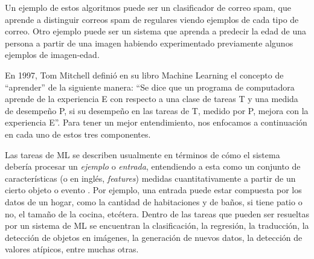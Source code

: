 \documentclass[../../main.tex]{subfiles}
\begin{document}
Un ejemplo de estos algoritmos puede ser un clasificador de correo spam, que aprende a distinguir correos spam de regulares viendo ejemplos de cada tipo de correo. Otro ejemplo puede ser un sistema que aprenda a predecir la edad de una persona a partir de una imagen habiendo experimentado previamente algunos ejemplos de imagen-edad.

En 1997, Tom Mitchell definió en su libro Machine Learning \cite{ml-tom-mitchell} el concepto de ``aprender'' de la siguiente manera: ``Se dice que un programa de computadora aprende de la experiencia E con respecto a una clase de tareas T y una medida de desempeño P, si su desempeño en las tareas de T, medido por P, mejora con la experiencia E''. Para tener un mejor entendimiento, nos enfocamos a continuación en cada uno de estos tres componentes.

Las tareas de ML se describen usualmente en términos de cómo el sistema debería procesar un \textit{ejemplo} o \textit{entrada}, entendiendo a esta como un conjunto de características (o en inglés, \textit{features}) medidas cuantitativamente a partir de un cierto objeto o evento \cite{deep-learning}. Por ejemplo, una entrada puede estar compuesta por los datos de un hogar, como la cantidad de habitaciones y de baños, si tiene patio o no, el tamaño de la cocina, etcétera. Dentro de las tareas que pueden ser resueltas por un sistema de ML se encuentran la clasificación, la regresión, la traducción, la detección de objetos en imágenes, la generación de nuevos datos, la detección de valores atípicos, entre muchas otras.
\end{document}
